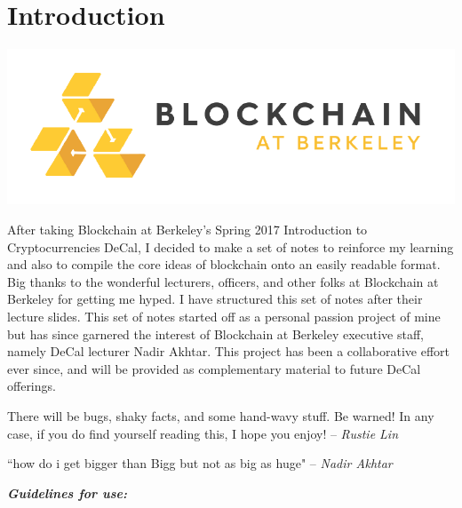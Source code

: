 \documentclass[full.tex]{subfiles}
\begin{document}
    \thispagestyle{firstpage}
    \vspace*{2\baselineskip}
    \section*{Introduction}
    
    \begin{center}
         \includegraphics[scale=0.5]{bab} \\

    \end{center}
     
     
    After taking Blockchain at Berkeley's Spring 2017 Introduction to Cryptocurrencies DeCal, I decided to make a set of notes to reinforce my learning and also to compile the core ideas of blockchain onto an easily readable format. Big thanks to the wonderful lecturers, officers, and other folks at Blockchain at Berkeley for getting me hyped. I have structured this set of notes after their lecture slides. This set of notes started off as a personal passion project of mine but has since garnered the interest of Blockchain at Berkeley executive staff, namely DeCal lecturer Nadir Akhtar. This project has been a collaborative effort ever since, and will be provided as complementary material to future DeCal offerings.
    
    There will be bugs, shaky facts, and some hand-wavy stuff. Be warned! In any case, if you do find yourself reading this, I hope you enjoy! -- \textit{Rustie Lin} 
    
    \medskip
    
    ``how do i get bigger than Bigg but not as big as huge" -- \textit{Nadir Akhtar}
    
    \bigskip
    
    \noindent \textbf{\textit{Guidelines for use:}}
    
\end{document}
